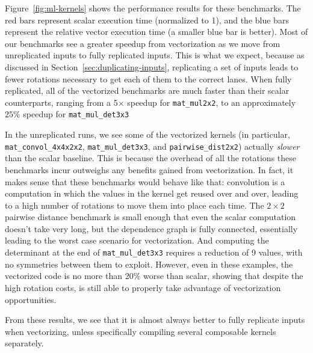 Figure~\ref{fig:ml-kernels} shows the performance results for these benchmarks.
The red bars represent scalar execution time (normalized to 1), and the blue bars represent the relative vector execution time (a smaller blue bar is better).
Most of our benchmarks see a greater speedup from vectorization as we move from unreplicated inputs to fully replicated inputs.
This is what we expect, because as discussed in Section~\ref{sec:duplicating-inputs}, replicating a set of inputs leads to fewer rotations necessary to get each of them to the correct lanes.
When fully replicated, all of the vectorized benchmarks are much faster than their scalar counterparts, ranging from a 5$\times$ speedup for \texttt{mat\_mul2x2}, to an approximately $25\%$ speedup for \texttt{mat\_mul\_det3x3}

In the unreplicated runs, we see some of the vectorized kernels (in particular, \texttt{mat\_convol\_4x4x2x2}, \texttt{mat\_mul\_det3x3}, and \texttt{pairwise\_dist2x2}) actually {\em slower} than the scalar baseline.
This is because the overhead of all the rotations these benchmarks incur outweighs any benefits gained from vectorization.
In fact, it makes sense that these benchmarks would behave like that: convolution is a computation in which the values in the kernel get reused over and over, leading to a high number of rotations to move them into place each time.
The $2\times 2$ pairwise distance benchmark is small enough that even the scalar computation doesn't take very long, but the dependence graph is fully connected, essentially leading to the worst case scenario for vectorization.
And computing the determinant at the end of \texttt{mat\_mul\_det3x3} requires a reduction of 9 values, with no symmetries between them to exploit.
However, even in these examples, the vectorized code is no more than 20\% worse than scalar, showing that despite the high rotation costs, \system is still able to properly take advantage of vectorization opportunities.


From these results, we see that it is almost always better to fully replicate inputs when vectorizing, unless specifically compiling several composable kernels separately.

